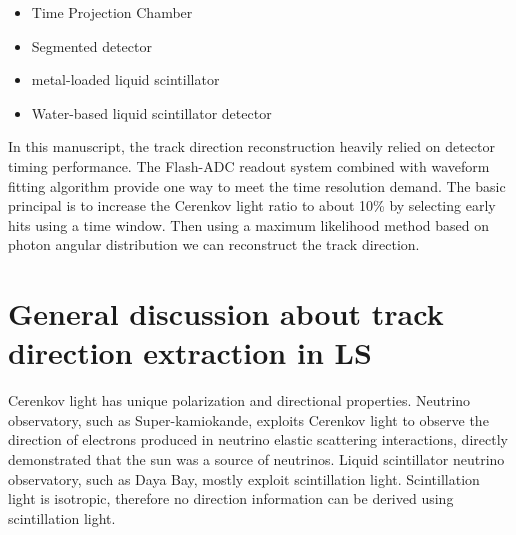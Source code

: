 \documentclass[a4paper,10pt]{cpc-hepnp}
\begin{document}
\begin{itemize}
\item Time Projection Chamber
\item Segmented detector
\item metal-loaded liquid scintillator
\item Water-based liquid scintillator detector
\end{itemize}

In this manuscript, the track direction reconstruction heavily relied on
detector timing performance. The Flash-ADC readout system combined with
waveform fitting algorithm provide one way to meet the time resolution demand.
The basic principal is to increase the Cerenkov light ratio to about 10\% by selecting early
hits using a time window. Then using a maximum
likelihood method based on photon angular distribution we can reconstruct the
track direction.

\section{General discussion about track direction extraction in LS}

Cerenkov light has unique polarization and directional properties.
Neutrino observatory, such as Super-kamiokande, exploits Cerenkov
light to observe the direction of electrons produced in neutrino
elastic scattering interactions, directly demonstrated that the
sun was a source of neutrinos.
Liquid scintillator neutrino observatory,
such as Daya Bay, mostly exploit scintillation light.
Scintillation light is isotropic, therefore no direction information can be
derived using scintillation light.
\end{document}
